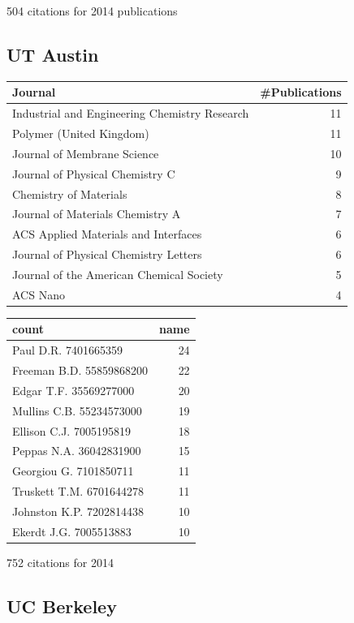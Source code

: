 \documentclass[11pt]{article}
\begin{document}
504 citations for 2014 publications

\subsection{UT Austin}
\label{sec-1-4}
\begin{center}
\begin{tabular}{lr}
Journal & \#Publications\\
\hline
Industrial and Engineering Chemistry Research & 11\\
Polymer (United Kingdom) & 11\\
Journal of Membrane Science & 10\\
Journal of Physical Chemistry C & 9\\
Chemistry of Materials & 8\\
Journal of Materials Chemistry A & 7\\
ACS Applied Materials and Interfaces & 6\\
Journal of Physical Chemistry Letters & 6\\
Journal of the American Chemical Society & 5\\
ACS Nano & 4\\
\end{tabular}
\end{center}

\begin{center}
\begin{tabular}{lr}
count & name\\
\hline
Paul D.R. 7401665359 & 24\\
Freeman B.D. 55859868200 & 22\\
Edgar T.F. 35569277000 & 20\\
Mullins C.B. 55234573000 & 19\\
Ellison C.J. 7005195819 & 18\\
Peppas N.A. 36042831900 & 15\\
Georgiou G. 7101850711 & 11\\
Truskett T.M. 6701644278 & 11\\
Johnston K.P. 7202814438 & 10\\
Ekerdt J.G. 7005513883 & 10\\
\end{tabular}
\end{center}

752 citations for 2014

\subsection{UC Berkeley}
\label{sec-1-5}
\end{document}
